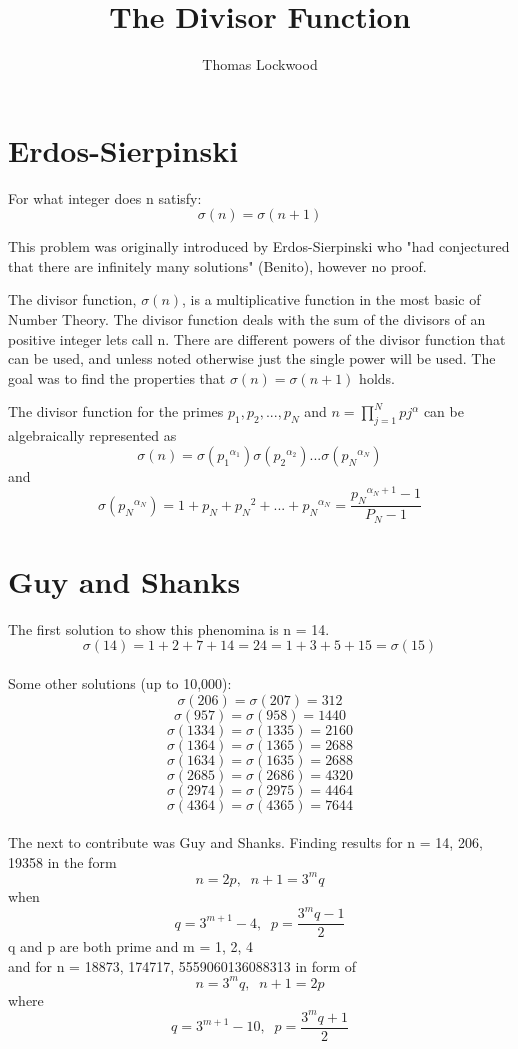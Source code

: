 \documentclass[12pt]{amsart}
\title{The Divisor Function}
\author{Thomas Lockwood}
\begin{document}
\maketitle

\section{Erdos-Sierpinski}
For what integer does n satisfy:
$$\sigma(n) = \sigma(n+1)$$

This problem was originally introduced by Erdos-Sierpinski who "had conjectured that there are infinitely many solutions" (Benito), however no proof. 

The divisor function, $\sigma{(n)}$, is a multiplicative function in the most basic of Number Theory. The divisor function deals with the sum of the divisors of an positive integer lets call n. There are different powers of the divisor function that can be used, and unless noted otherwise just the single power will be used. The goal was to find the properties that $\sigma{(n)}=\sigma{(n+1)}$ holds. 

The divisor function for the primes $p_1, p_2, ... , p_N$  and $n = \prod_{j=1}^N {{pj}^\alpha}$ can be algebraically represented as $$\sigma(n) = \sigma({p_1}^{\alpha_1})\sigma({p_2}^{\alpha_2})...\sigma({p_N}^{\alpha_N})$$ and $$\sigma({p_N}^{\alpha_N}) = 1 + {p_N} + {p_N}^2 + ... + {p_N}^{\alpha_N} = \frac{{p_N}^{\alpha_N + 1} -1} {P_N - 1}$$

\section{Guy and Shanks}
\noindent
The first solution to show this phenomina is n = 14. 
\\
$$\sigma(14)= 1 + 2 + 7 + 14 = 24 = 1 + 3 + 5 + 15 = \sigma(15)$$ 
\\
Some other solutions (up to 10,000):
\\
$$\sigma(206) = \sigma(207) = 312$$
$$\sigma(957) = \sigma(958) = 1440$$
$$\sigma(1334) = \sigma(1335) = 2160$$
$$\sigma(1364) = \sigma(1365) = 2688$$
$$\sigma(1634) = \sigma(1635) = 2688$$
$$\sigma(2685) = \sigma(2686) = 4320$$
$$\sigma(2974) = \sigma(2975) = 4464$$
$$\sigma(4364) = \sigma(4365) = 7644$$
\\

The next to contribute was Guy and Shanks. Finding results for n = 14, 206, 19358 in the form $$n = 2p,\; \; n + 1 = 3^{m}q$$ when $$q = 3^{m+1} - 4, \; \; p=\frac{3^{m}q-1} {2}$$ q and p are both prime and m = 1, 2, 4
\\
and for n = 18873, 174717, 5559060136088313 in form of $$n = 3^{m}q, \; \; n+1 = 2p$$ where $$q = 3^{m+1} - 10, \; \; p = \frac{3^{m}q + 1} {2}$$
\end{document}
